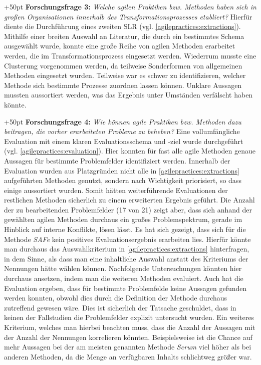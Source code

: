 \hangindent+50pt 
\textbf{Forschungsfrage 3:} \textit{Welche agilen Praktiken bzw. Methoden haben sich in großen Organisationen innerhalb des Transformationsprozesses etabliert?
} Hierfür diente die Durchführung eines zweiten SLR (vgl. \ref{agilepractices:extractions}). Mithilfe einer breiten Auswahl an Literatur, die durch ein bestimmtes Schema ausgewählt wurde, konnte eine große Reihe von agilen Methoden erarbeitet werden, die im Transformationsprozess eingesetzt werden. Wiederrum musste eine Clusterung vorgenommen werden, da teilweise Sonderformen von allgemeinen Methoden eingesetzt wurden. Teilweise war es schwer zu identifizieren, welcher Methode sich bestimmte Prozesse zuordnen lassen können. Unklare Aussagen mussten aussortiert werden, was das Ergebnis unter Umständen verfälscht haben könnte.

\hangindent+50pt 
\textbf{Forschungsfrage 4:} \textit{Wie können agile Praktiken bzw. Methoden dazu beitragen, die vorher erarbeiteten Probleme zu beheben?} Eine vollumfängliche Evaluation mit einem klaren Evaluationsschema und -ziel wurde durchgeführt (vgl. \ref{agilepractices:evaluation}). Hier konnten für fast alle agile Methoden genaue Aussagen für bestimmte Problemfelder identifiziert werden. Innerhalb der Evaluation wurden aus Platzgründen nicht alle in \ref{agilepractices:extractions} aufgeführten Methoden genutzt, sondern nach Wichtigkeit priorisiert, so dass einige aussortiert wurden. Somit hätten weiterführende Evaluationen der restlichen Methoden sicherlich zu einem erweiterten Ergebnis geführt. Die Anzahl der zu bearbeitenden Problemfelder (17 von 21) zeigt aber, dass sich anhand der gewählten agilen Methoden durchaus ein großes Problemspektrum, gerade im Hinblick auf interne Konflikte, lösen lässt. Es hat sich gezeigt, dass sich für die Methode \textit{SAFe} kein positives Evaluationsergebnis erarbeiten lies. Hierfür könnte man durchaus das Auswahlkriterium in \ref{agilepractices:extractions} hinterfragen, in dem Sinne, als dass man eine inhaltliche Auswahl anstatt des Kriteriums der Nennungen hätte wählen können. Nachfolgende Untersuchungen könnten hier durchaus ansetzen, indem man die weiteren Methoden evaluiert. Auch hat die Evaluation ergeben, dass für bestimmte Problemfelde keine Aussagen gefunden werden konnten, obwohl dies durch die Definition der Methode durchaus zutreffend gewesen wäre. Dies ist sicherlich der Tatsache geschuldet, dass in keinen der Fallstudien die Problemfelder explizit untersucht wurden. Ein weiteres Kriterium, welches man hierbei beachten muss, dass die Anzahl der Aussagen mit der Anzahl der Nennungen korrelieren könnten. Beispielsweise ist die Chance auf mehr Aussagen bei der am meisten genannten Methode  \textit{Scrum} viel höher als bei anderen Methoden, da die Menge an verfügbaren Inhalts schlichtweg größer war. 

